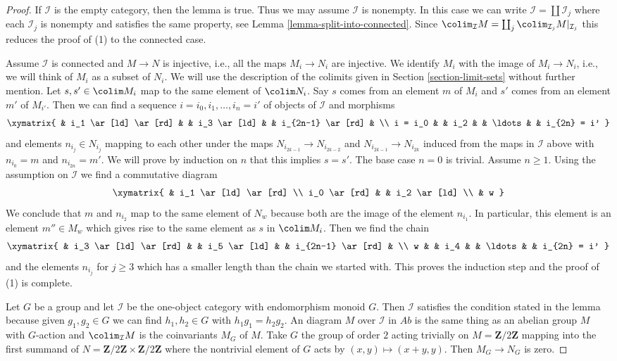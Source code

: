 \begin{proof}
If $\mathcal{I}$ is the empty category, then the lemma is true.
Thus we may assume $\mathcal{I}$ is nonempty. In this case
we can write $\mathcal{I} = \coprod \mathcal{I}_j$ where each
$\mathcal{I}_j$ is nonempty and satisfies the same property, see
Lemma \ref{lemma-split-into-connected}. Since
$\colim_\mathcal{I} M = \coprod_j \colim_{\mathcal{I}_j} M|_{\mathcal{I}_j}$
this reduces the proof of (1) to the connected case.

\medskip\noindent
Assume $\mathcal{I}$ is connected and $M \to N$ is injective, i.e.,
all the maps $M_i \to N_i$ are injective.
We identify $M_i$ with the image of $M_i \to N_i$, i.e.,
we will think of $M_i$ as a subset of $N_i$.
We will use the description of the colimits given in
Section \ref{section-limit-sets} without further mention.
Let $s, s' \in \colim M_i$ map to the same element of $\colim N_i$.
Say $s$ comes from an element $m$ of $M_i$ and $s'$ comes from an
element $m'$ of $M_{i'}$. Then we can find a sequence
$i = i_0, i_1, \ldots, i_n = i'$ of objects of $\mathcal{I}$
and morphisms
$$
\xymatrix{
&
i_1 \ar[ld] \ar[rd] & &
i_3 \ar[ld] & &
i_{2n-1} \ar[rd] & \\
i = i_0 & &
i_2 & &
\ldots & &
i_{2n} = i'
}
$$
and elements $n_{i_j} \in N_{i_j}$ mapping to each other under
the maps $N_{i_{2k-1}} \to N_{i_{2k-2}}$ and $N_{i_{2k-1}}
\to N_{i_{2k}}$ induced from the maps in $\mathcal{I}$ above
with $n_{i_0} = m$ and $n_{i_{2n}} = m'$. We will prove by induction
on $n$ that this implies $s = s'$. The base case $n = 0$ is trivial.
Assume $n \geq 1$. Using the assumption on $\mathcal{I}$
we find a commutative diagram
$$
\xymatrix{
& i_1 \ar[ld] \ar[rd] \\
i_0 \ar[rd] & & i_2 \ar[ld] \\
& w
}
$$
We conclude that $m$ and $n_{i_2}$ map to the same element of $N_w$
because both are the image of the element $n_{i_1}$.
In particular, this element is an element $m'' \in M_w$ which
gives rise to the same element as $s$ in $\colim M_i$.
Then we find the chain
$$
\xymatrix{
&
i_3 \ar[ld] \ar[rd] & &
i_5 \ar[ld] & &
i_{2n-1} \ar[rd] & \\
w & &
i_4 & &
\ldots & &
i_{2n} = i'
}
$$
and the elements $n_{i_j}$ for $j \geq 3$ which has a smaller length
than the chain we started with. This proves the induction step and the
proof of (1) is complete.

\medskip\noindent
Let $G$ be a group and let $\mathcal{I}$ be the one-object category with
endomorphism monoid $G$. Then $\mathcal{I}$ satisfies the condition stated
in the lemma because given $g_1, g_2 \in G$ we can find $h_1, h_2 \in G$
with $h_1 g_1 = h_2 g_2$. An diagram $M$ over $\mathcal{I}$ in
$\textit{Ab}$ is the same thing as an abelian group $M$ with $G$-action
and $\colim_\mathcal{I} M$ is the coinvariants $M_G$ of $M$.
Take $G$ the group of order $2$ acting trivially on $M = \mathbf{Z}/2\mathbf{Z}$
mapping into the first summand of
$N = \mathbf{Z}/2\mathbf{Z} \times \mathbf{Z}/2\mathbf{Z}$
where the nontrivial element of $G$ acts by
$(x, y) \mapsto (x + y, y)$. Then $M_G \to N_G$ is zero.
\end{proof}

